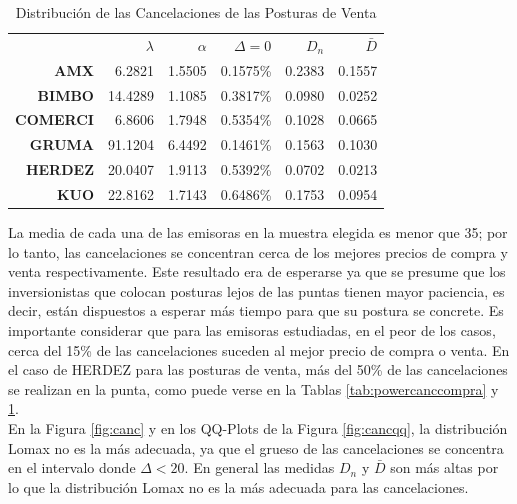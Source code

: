 \documentclass[11pt]{article}
\numberwithin{equation}{section} %
\begin{document}
\begin{table}[htbp]
\centering
\caption{Distribución de las Cancelaciones de las Posturas de Venta}
\renewcommand{\arraystretch}{1.2}
\begin{tabular}{r|r|r|r|r|r|}
\cline{2-6}
& $\lambda$ & $\alpha$ & $\Delta=0$ & $D_n$ & $\bar{D}$ \\
\cline{2-6}
\textbf{AMX}   & 6.2821 & 1.5505 & 0.1575\% & 0.2383 & 0.1557 \\
\textbf{BIMBO} & 14.4289 & 1.1085 & 0.3817\% & 0.0980 & 0.0252 \\
\textbf{COMERCI}   & 6.8606 & 1.7948 & 0.5354\% & 0.1028 & 0.0665 \\
\textbf{GRUMA} & 91.1204 & 6.4492 & 0.1461\% & 0.1563 & 0.1030 \\
\textbf{HERDEZ}   & 20.0407 & 1.9113 & 0.5392\% & 0.0702 & 0.0213 \\
\textbf{KUO}   & 22.8162 & 1.7143 & 0.6486\% & 0.1753 & 0.0954 \\
\cline{2-6}
\end{tabular}%
\label{tab:powercancventa}%
\end{table}%

La media de cada una de las emisoras en la muestra elegida es menor que 35; por lo tanto, las cancelaciones se concentran cerca de los mejores precios de compra y venta respectivamente. Este resultado era de esperarse ya que se presume que los inversionistas que colocan posturas lejos de las puntas tienen mayor paciencia, es decir, están dispuestos a esperar más tiempo para que su postura se concrete.  Es importante considerar que para las emisoras estudiadas, en el peor de los casos, cerca del 15\% de las cancelaciones suceden al mejor precio de compra o venta. En el caso de HERDEZ para las posturas de venta, más del 50\% de las cancelaciones se realizan en la punta, como puede verse en la Tablas \ref{tab:powercanccompra} y \ref{tab:powercancventa}.\\

En la Figura \ref{fig:canc} y en los QQ-Plots de la Figura \ref{fig:cancqq}, la distribución Lomax no es la más adecuada, ya que el grueso de las cancelaciones se concentra en el intervalo donde $\Delta<20$. En general las medidas $D_n$ y $\bar{D}$ son más altas por lo que la distribución Lomax no es la más adecuada para las cancelaciones.

\clearpage
\end{document}
